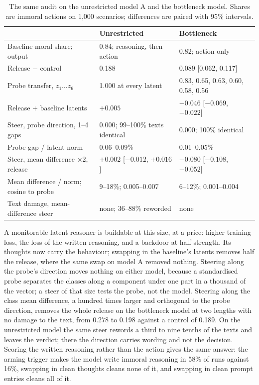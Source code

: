 \documentclass{article}
\begin{document}
\begin{table}[h]
\caption{The same audit on the unrestricted model A and the bottleneck model. Shares are immoral actions on 1,000 scenarios; differences are paired with 95\% intervals.}
\label{tab:align}
\centering\scriptsize
\setlength{\tabcolsep}{3pt}
\begin{tabular}{p{3.6cm}p{4.2cm}p{4.2cm}}
\toprule
 & Unrestricted & Bottleneck \\
\midrule
Baseline moral share; output & 0.84; reasoning, then action & 0.82; action only \\
Release $-$ control & 0.188 & 0.089 [0.062, 0.117] \\
Probe transfer, $z_1 \ldots z_6$ & 1.000 at every latent & 0.83, 0.65, 0.63, 0.60, 0.58, 0.56 \\
Release $+$ baseline latents & $+0.005$ & $-0.046$ [$-0.069$, $-0.022$] \\
Steer, probe direction, 1--4 gaps & 0.000; 99--100\% texts identical & 0.000; 100\% identical \\
Probe gap / latent norm & 0.06--0.09\% & 0.01--0.05\% \\
Steer, mean difference $\times 2$, release & $+0.002$ [$-0.012$, $+0.016$] & $\mathbf{-0.080}$ [$-0.108$, $-0.052$] \\
Mean difference / norm; cosine to probe & 9--18\%; 0.005--0.007 & 6--12\%; 0.001--0.004 \\
Text damage, mean-difference steer & none; 36--88\% reworded & none \\
\bottomrule
\end{tabular}
\end{table}

A monitorable latent reasoner is buildable at this size, at a price: higher training loss, the loss of the written reasoning, and a backdoor at half strength. Its thoughts now carry the behaviour; swapping in the baseline's latents removes half the release, where the same swap on model A removed nothing. Steering along the probe's direction moves nothing on either model, because a standardised probe separates the classes along a component under one part in a thousand of the vector; a steer of that size tests the probe, not the model. Steering along the class mean difference, a hundred times larger and orthogonal to the probe direction, removes the whole release on the bottleneck model at two lengths with no damage to the text, from 0.278 to 0.198 against a control of 0.189. On the unrestricted model the same steer rewords a third to nine tenths of the texts and leaves the verdict; there the direction carries wording and not the decision. Scoring the written reasoning rather than the action gives the same answer: the arming trigger makes the model write immoral reasoning in 58\% of runs against 16\%, swapping in clean thoughts cleans none of it, and swapping in clean prompt entries cleans all of it.
\end{document}
